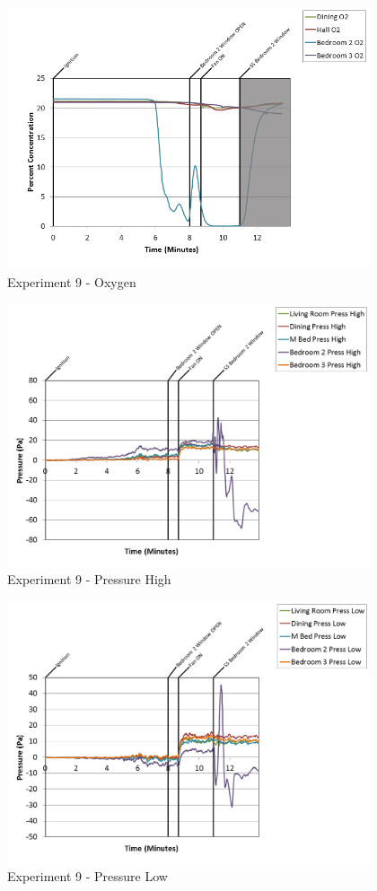 \documentclass{article}
\begin{document}
\begin{appendices}
\clearpage

\begin{figure}[h!]
	\centering
	\includegraphics[height=3.05in]{0_Images/Results_Charts/Exp_9_Charts/Oxygen.png}
	\caption{Experiment 9 - Oxygen}
\end{figure}


\begin{figure}[h!]
	\centering
	\includegraphics[height=3.05in]{0_Images/Results_Charts/Exp_9_Charts/PressureHigh.png}
	\caption{Experiment 9 - Pressure High}
\end{figure}

\clearpage

\begin{figure}[h!]
	\centering
	\includegraphics[height=3.05in]{0_Images/Results_Charts/Exp_9_Charts/PressureLow.png}
	\caption{Experiment 9 - Pressure Low}
\end{figure}



\end{appendices}
\end{document}

